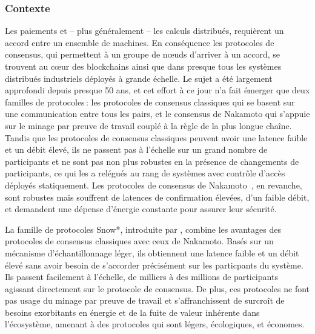 \documentclass[runningheads,francais,a4paper]{llncs}
\begin{document}
\subsubsection{Contexte}
Les paiements et -- plus généralement -- les calculs distribués, requièrent un accord entre un ensemble de machines. En
conséquence les protocoles de consensus, qui permettent à un groupe de nœuds d'arriver à un accord, se trouvent au cœur
des blockchains ainsi que dans presque tous les systèmes distribués industriels déployés à grande échelle. Le sujet a
été largement approfondi depuis presque 50 ans, et cet effort à ce jour n'a fait émerger que deux familles de
protocoles\,: les protocoles de consensus classiques qui se basent sur une communication entre tous les pairs, et le
consensus de Nakamoto qui s'appuie sur le minage par preuve de travail couplé à la règle de la plus longue chaîne.
Tandis que les protocoles de consensus classiques peuvent avoir une latence faible et un débit élevé, ils ne passent
pas à l'échelle sur un grand nombre de participants et ne sont pas non plus robustes en la présence de changements de
participants, ce qui les a relégués au rang de systèmes avec contrôle d'accès déployés statiquement. Les protocoles de
consensus de Nakamoto~\cite{nakamoto2008bitcoin,wood2014ethereum,EyalGSR16}, en revanche, sont robustes mais souffrent
de latences de confirmation élevées, d'un faible débit, et demandent une dépense d'énergie constante pour assurer leur
sécurité.

La famille de protocoles Snow*, introduite par \AVAPlatformName{}, combine les avantages des protocoles de consensus
classiques avec ceux de Nakamoto. Basés sur un mécanisme d'échantillonnage léger, ils obtiennent une
latence faible et un débit élevé sans avoir besoin de s'accorder précisément sur les particpants du système.
Ils passent facilement à l'échelle, de milliers à des millions de participants agissant directement sur le protocole de
consensus. De plus, ces protocoles ne font pas usage du minage par preuve de travail et s'affranchissent de surcroît
de besoins exorbitants en énergie et de la fuite de valeur inhérente dans l'écosystème, amenant à des protocoles qui
sont légers, écologiques, et économes. %
\end{document}
